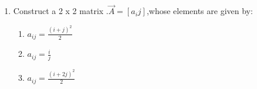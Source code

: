 \renewcommand{\theequation}{\theenumi}
\begin{enumerate}[label=\arabic*.,ref=\thesubsection.\theenumi]
\item Construct a 2 x 2 matrix .$\vec A = \left[a_ij\right]$,whose elements  are given by:
\begin{enumerate}
	\item $a_{ij} = \frac{(i+j)^2}{2}$
	\item $a_{ij} = \frac{i}{j}$
	\item $a_{ij} = \frac{(i+2j)^2}{2}$
\end{enumerate}
\end{enumerate}